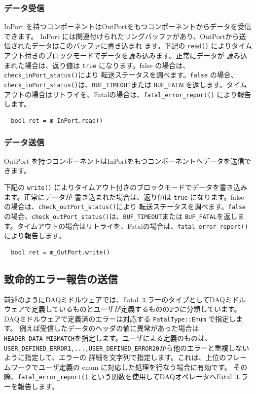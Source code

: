 \documentclass[a4j,10pt,dvips,onecolumn,oneside,final]{jarticle}%
\begin{document}
\subsubsection{データ受信}
InPort を持つコンポーネントはOutPortをもつコンポーネントからデータを受信できます。
InPort には関連付けられたリングバッファがあり、OutPortから送信されたデータはこのバッファに書き込まれ
ます。下記の \verb|read()| によりタイムアウト付きのブロックモードでデータを読み込みます。正常にデータが
読み込まれた場合は、返り値は \verb|true| になります。false の場合は、\verb|check_inPort_status()|により
転送ステータスを調べます。\verb|false| の場合、\verb|check_inPort_status()|は、\verb|BUF_TIMEOUT|または
\verb|BUF_FATAL|を返します。タイムアウトの場合はリトライを、Fatalの場合は、\verb|fatal_error_report()|
により報告します。

\begin{Verbatim}
  bool ret = m_InPort.read()
\end{Verbatim}

\subsubsection{データ送信}
OutPort を持つコンポーネントはInPortをもつコンポーネントへデータを送信できます。

下記の \verb|write()| によりタイムアウト付きのブロックモードでデータを書き込みます。正常にデータが
書き込まれた場合は、返り値は \verb|true| になります。false の場合は、\verb|check_outPort_status()|により
転送ステータスを調べます。\verb|false| の場合、\verb|check_outPort_status()|は、\verb|BUF_TIMEOUT|または
\verb|BUF_FATAL|を返します。タイムアウトの場合はリトライを、Fatalの場合は、\verb|fatal_error_report()|
により報告します。
\begin{Verbatim}
  bool ret = m_OutPort.write()
\end{Verbatim}

\subsection{致命的エラー報告の送信}\label{fatal_error}
前述のようにDAQミドルウェアでは、Fatal エラーのタイプとしてDAQミドルウェアで定義しているものとユーザが定義するものの2つに分類しています。
DAQミドルウェアで定義済のエラーは対応する \verb|FatalType::Enum| で指定します。 例えば受信したデータのヘッダの値に異常があった場合は
\verb|HEADER_DATA_MISMATCH|を指定します。ユーザによる定義のものは、
\verb|USER_DEFINED_ERROR1,...,USER_DEFINED_ERROR20|から他のエラーと重複しないように指定して、エラーの
詳細を文字列で指定します。これは、上位のフレームワークでユーザ定義の enum に対応した処理を行なう場合に有効です。
その際、\verb|fatal_error_report()| という関数を使用してDAQオペレータへFatal エラーを報告します。
\end{document}
